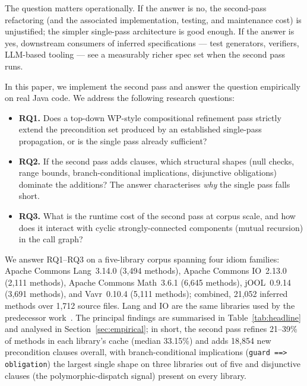 The question matters operationally. If the answer is no, the
second-pass refactoring (and the associated implementation, testing,
and maintenance cost) is unjustified; the simpler single-pass
architecture is good enough. If the answer is yes, downstream
consumers of inferred specifications --- test generators, verifiers,
LLM-based tooling --- see a measurably richer spec set when the second
pass runs.

In this paper, we implement the second pass and answer the question
empirically on real Java code. We address the following research
questions:

\begin{itemize}\setlength\itemsep{0.2em}
  \item \textbf{RQ1.} Does a top-down WP-style compositional refinement
        pass strictly extend the precondition set produced by an
        established single-pass propagation, or is the single pass
        already sufficient?
  \item \textbf{RQ2.} If the second pass adds clauses, which structural
        shapes (null checks, range bounds, branch-conditional
        implications, disjunctive obligations) dominate the additions?
        The answer characterises \emph{why} the single pass falls
        short.
  \item \textbf{RQ3.} What is the runtime cost of the second pass at
        corpus scale, and how does it interact with cyclic
        strongly-connected components (mutual recursion) in the call
        graph?
\end{itemize}

We answer RQ1--RQ3 on a five-library corpus spanning four idiom
families: Apache Commons Lang~3.14.0 (3{,}494 methods), Apache
Commons IO~2.13.0 (2{,}111 methods), Apache Commons Math~3.6.1
(6{,}645 methods), jOOL~0.9.14 (3{,}691 methods), and Vavr~0.10.4
(5{,}111 methods); combined, 21{,}052 inferred methods over 1{,}712
source files. Lang and IO are the same libraries used by the
predecessor work~\cite{edmonds2026inference, edmonds2026embedding}.
The principal findings are summarised in Table~\ref{tab:headline}
and analysed in Section~\ref{sec:empirical}; in short, the second
pass refines 21--39\% of methods in each library's cache (median
33.15\%) and adds 18{,}854 new precondition clauses overall, with
branch-conditional implications (\texttt{guard ==> obligation}) the
largest single shape on three libraries out of five and disjunctive
clauses (the polymorphic-dispatch signal) present on every library.

